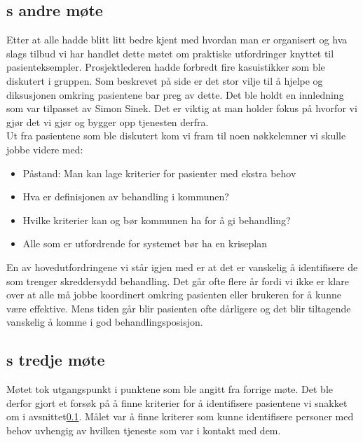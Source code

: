 \documentclass[11pt]{report} %
\begin{document}
                  \subsection{s andre møte}\label{sec:agr_2}
                    Etter at alle hadde blitt litt bedre kjent med hvordan man er organisert og hva slags tilbud vi har handlet dette møtet om praktiske utfordringer knyttet til pasienteksempler. Prosjektlederen hadde forbredt fire kasuistikker som ble diskutert i gruppen. Som beskrevet på side \pageref{stor_vilje_til_hjelp} er det stor vilje til å hjelpe og diksusjonen omkring pasientene bar preg av dette\cite{arbgr_mref-2}. Det ble holdt en innledning som var tilpasset av Simon Sinek\cite{sinek09}. Det er viktig at man holder fokus på hvorfor vi gjør det vi gjør og bygger opp tjenesten derfra. \\
                    Ut fra pasientene som ble diskutert kom vi fram til noen nøkkelemner vi skulle jobbe videre med:\\
                      \begin{itemize}
                        \item Påstand: Man kan lage kriterier for pasienter med ekstra behov\\
                        \item Hva er definisjonen av behandling i kommunen?\\
                        \item Hvilke kriterier kan og bør kommunen ha for å gi behandling?\\
                        \item Alle som er utfordrende for systemet bør ha en kriseplan\\
                      \end{itemize}
                    En av hovedutfordringene vi står igjen med er at det er vanskelig å identifisere de som trenger skreddersydd behandling. Det går ofte flere år fordi vi ikke er klare over at alle må jobbe koordinert omkring pasienten eller brukeren for å kunne være effektive. Mens tiden går blir pasienten ofte dårligere og det blir tiltagende vanskelig å komme i god behandlingsposisjon.   

                  \subsection{s tredje møte}\label{sec:agr_3}
                    Møtet tok utgangspunkt i punktene som ble angitt fra forrige møte\cite{arbgr_mref-2}. Det ble derfor gjort et forsøk på å finne kriterier for å identifisere pasientene vi snakket om i avsnittet\ref{sec:agr_2}. Målet var å finne kriterer som kunne identifisere personer med behov uvhengig av hvilken tjeneste som var i kontakt med dem. \\
\end{document}
